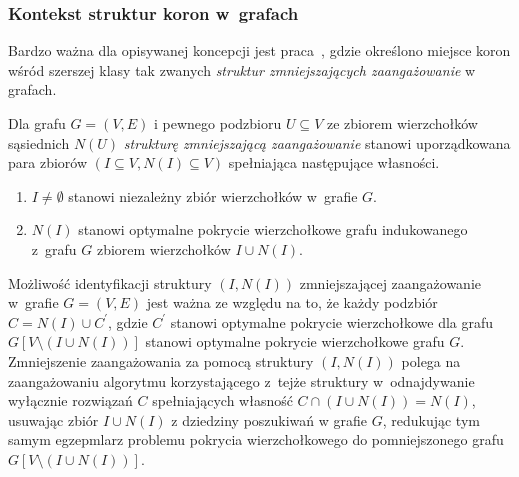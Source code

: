 \subsubsection{\textbf{Kontekst struktur koron w~grafach}}
\label{sss_kernelization_crown_context}
\par{
  Bardzo ważna dla opisywanej koncepcji jest praca~\cite{chlebik:crown}, gdzie określono miejsce koron wśród szerszej klasy tak zwanych \emph{struktur zmniejszających zaangażowanie} w grafach.
  \begin{definition}
    Dla grafu $G=(V, E)$ i pewnego podzbioru $U \subseteq V$ ze zbiorem wierzchołków sąsiednich $N(U)$ \emph{strukturę zmniejszającą zaangażowanie} stanowi uporządkowana para zbiorów $(I \subseteq V, N(I) \subseteq V)$ spełniająca następujące własności.
    \begin{enumerate}
      \item $I \neq \emptyset$ stanowi niezależny zbiór wierzchołków w~grafie $G$.
      \item $N(I)$ stanowi optymalne pokrycie wierzchołkowe grafu indukowanego z~grafu $G$ zbiorem wierzchołków $I \cup N(I)$.
    \end{enumerate}
  \end{definition}
  Możliwość identyfikacji struktury $(I, N(I))$ zmniejszającej zaangażowanie w~grafie $G=(V, E)$ jest ważna ze względu na to, że każdy podzbiór $C=N(I)\cup C^\prime$, gdzie $C^\prime$ stanowi optymalne pokrycie wierzchołkowe dla grafu $G[V \setminus (I\cup N(I))]$ stanowi optymalne pokrycie wierzchołkowe grafu $G$.
  Zmniejszenie zaangażowania za pomocą struktury $(I, N(I))$ polega na zaangażowaniu algorytmu korzystającego z~tejże struktury w~odnajdywanie wyłącznie rozwiązań $C$ spełniających własność $C \cap (I \cup N(I)) = N(I)$, usuwając zbiór $I \cup N(I)$ z dziedziny poszukiwań w grafie $G$, redukując tym samym egzepmlarz problemu pokrycia wierzchołkowego do pomniejszonego grafu $G[V \setminus (I \cup N(I))]$.
}

